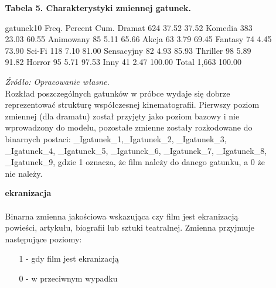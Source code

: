 \begin{itemize}
\begin{itemize}
 \vspace{0.5cm}
	
{\centering
\textbf{Tabela 5. Charakterystyki zmiennej gatunek.}}
\begin{stlog}	
	
  gatunek10 {\VBAR}      Freq.     Percent        Cum.
     Dramat {\VBAR}        624       37.52       37.52
    Komedia {\VBAR}        383       23.03       60.55
  Animowany {\VBAR}         85        5.11       65.66
      Akcja {\VBAR}         63        3.79       69.45
    Fantasy {\VBAR}         74        4.45       73.90
     Sci-Fi {\VBAR}        118        7.10       81.00
 Sensacyjny {\VBAR}         82        4.93       85.93
   Thriller {\VBAR}         98        5.89       91.82
     Horror {\VBAR}         95        5.71       97.53
       Inny {\VBAR}         41        2.47      100.00
      Total {\VBAR}      1,663      100.00
{\smallskip}

\end{stlog}

\textit{\footnotesize{Źródło: Opracowanie własne.}} \\

Rozkład poszczególnych gatunków w próbce wydaje się dobrze reprezentować strukturę współczesnej kinematografii.
Pierwszy poziom zmiennej (dla dramatu) został przyjęty jako poziom bazowy i nie wprowadzony do modelu, pozostałe zmienne zostały rozkodowane do binarnych postaci: _Igatunek_1,_Igatunek_2, _Igatunek_3, _Igatunek_4, _Igatunek_5, _Igatunek_6, _Igatunek_7, _Igatunek_8, _Igatunek_9, gdzie 1 oznacza, że film należy do danego gatunku, a 0 że nie należy.

\vspace{2cm}

	\item[\ding{228}]\textbf{ekranizacja} \\
	\\Binarna zmienna jakościowa wskazująca czy film jest ekranizacją powieści, artykułu, biografii lub sztuki teatralnej. Zmienna przyjmuje następujące poziomy:
	\begin{itemize}
	
	\item[1] - gdy film jest ekranizacją
	\item[0] - w przeciwnym wypadku
	
	\end{itemize}
	
	 \vspace{0.5cm}
	

\end{itemize}
\end{itemize}
